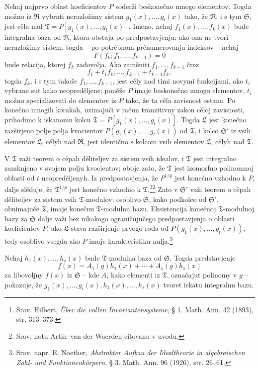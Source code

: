 \documentclass[11pt]{article}
\begin{document}
Nehaj najprvo oblast koeficientov $P$ soderži beskonečno mnogo elementov. Togda možno iz $\mathfrak R$ vybrati nerazložimy sistem $g_1(x),\ldots,g_t(x)$ tako, že $\mathfrak R$, i s tym $\mathfrak S$, jest cěla nad $\mathfrak T=P[g_1(x),\ldots,g_t(x)]$. Imeno, nehaj $f_1(x),\ldots,f_k(x)$ bude integralna baza od $\mathfrak R$, ktora obstaja po predpostavjenju; ako ona ne tvori nerazložimy sistem, togda -- po potrěbnom prěnumerovanju indeksov -- nehaj
\[
F(f_k;f_1,\ldots,f_{k-1})=0
\]
bude relacija, ktorej $f_k$ zadovolja. Ako zaměniti $f_1,\ldots,f_{k-1}$ črez
\[
 f_1+t_1f_k,\ldots,f_{k-1}+t_{k-1}f_k,
\]
togda $f_k$, i s tym takože $f_1,\ldots,f_{k-1}$, jest cěly nad timi novymi funkcijami, ako $t_i$ vybrane sut kako neopreděljene; poněže $P$ imaje beskonečno mnogo elementov, $t_i$ možno specializovati do elementov iz $P$ tako, že ta cěla zavisnost ostane. Po konečno mnogih korakah, uzimajuči v račun tranzitivny zakon cěloj zavisnosti, prihodimo k iskanomu kolcu $\mathfrak T=P[g_1(x),\ldots,g_t(x)]$. Togda $\mathfrak L$ jest konečno razširjeno polje polja kvocientov $P(g_1(x),\ldots,g_t(x))$ od $\mathfrak T$, i kolco $\mathfrak S'$ iz vsih elementov $\mathfrak L$, cělyh nad $\mathfrak R$, jest identično s kolcom vsih elementov $\mathfrak L$, cělyh nad $\mathfrak T$.

V $\mathfrak T$ važi teorem o cěpah děliteljev za sistem vsih idealov, i $\mathfrak T$ jest integralno zamknjeno v svojem polju kvocientov; oboje zato, že $\mathfrak T$ jest izomorfno polinomnoj oblasti od $t$ neopreděljenyh. Iz predpostavjenja, že $P^{1/p}$ jest konečno vzhodno k $P$, dalje slěduje, že $\mathfrak T^{1/p}$ jest konečno vzhodno k $\mathfrak T$.\footnote{Srav. Hilbert, \emph{Über die vollen Invariantensysteme}, § 1. Math. Ann. 42 (1893), str. 313--373.}\footnote{Srav. notu Artin--van der Waerden citovanu v uvodu.} Zato v $\mathfrak S'$ važi teorem o cěpah děliteljev za sistem vsih $\mathfrak T$-modulov; osoblivo $\mathfrak S$, kako podkolco od $\mathfrak S'$, obnimajuče $\mathfrak T$, imaje konečnu $\mathfrak T$-modulnu bazu. Eksistencija konečnoj $\mathfrak T$-modulnoj bazy za $\mathfrak S$ dalje važi bez nikakogo ograničujučego predpostavjenja o oblasti koeficientov $P$, ako $\mathfrak L$ stava razširjenje prvogo roda od $P(g_1(x),\ldots,g_t(x))$, tedy osoblivo vsegda ako $P$ imaje karakteristiku nulja.\footnote{Srav. napr. E. Noether, \emph{Abstrakter Aufbau der Idealtheorie in algebraischen Zahl- und Funktionenkörpern}, § 3. Math. Ann. 96 (1926), str. 26--61.}

Nehaj $h_1(x),\ldots,h_s(x)$ bude $\mathfrak T$-modulna baza od $\mathfrak S$. Togda predstavjenje
\[
 f(x)=A_1(g)h_1(x)+\cdots+A_s(g)h_s(x)
\]
za libovoljny $f(x)$ iz $\mathfrak S$ -- kde $A$, kako elementi iz $\mathfrak T$, označajut polinomy v $g$ -- pokazuje, že $g_1(x),\ldots,g_t(x),h_1(x),\ldots,h_s(x)$ tvoret iskatu integralnu bazu.
\end{document}
